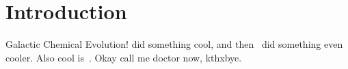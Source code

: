 \documentclass[main.tex]{subfiles}
\begin{document}
\chapter{Introduction}

Galactic Chemical Evolution!
\citet{Johnson2020} did something cool, and then~\citet{Johnson2021} did
something even cooler.
Also cool is~\citet{Johnson2022b}.
Okay call me doctor now, kthxbye.

\end{document}
